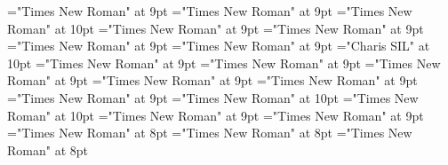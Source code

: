 \documentclass[gps1,twoside]{article}
\begin{document}
\font\complexformtypespansubentrysubentriesentrysubentriesdiventryletData="Times New Roman" at 9pt
\font\spancomplexformtypespansubentrysubentriesentrysubentriesdiventryletData="Times New Roman" at 9pt
\font\spanenspancomplexformtypespansubentrysubentriesentrysubentriesdiventryletData="Times New Roman" at 10pt
\font\spanreverseabbrvariantentrytypevariantentrytypesvariantformentrybackrefvariantformentrybackrefssensesensessensesensessubentrysubentriesentrylastchildafterspancomplexformtypespansubentrysubentriesentrysubentriesdiventryletData="Times New Roman" at 9pt
\font\pronunciationssubentrysubentriesentryaftersubentrysubentriesentrysubentriesdiventryletData="Times New Roman" at 9pt
\font\pronunciationspansubentrysubentriesentrysubentriesdiventryletData="Times New Roman" at 9pt
\font\spanpronunciationspansubentrysubentriesentrysubentriesdiventryletData="Times New Roman" at 9pt
\font\spanbzhfonipaspanpronunciationspansubentrysubentriesentrysubentriesdiventryletData="Charis SIL" at 10pt
\font\spanformpronunciationpronunciationssubentrysubentriesentryfirstchildbeforespanpronunciationspansubentrysubentriesentrysubentriesdiventryletData="Times New Roman" at 9pt
\font\spanformpronunciationpronunciationssubentrysubentriesentrylastchildafterspanpronunciationspansubentrysubentriesentrysubentriesdiventryletData="Times New Roman" at 9pt
\font\sensessubentrysubentriesentryaftersubentrysubentriesentrysubentriesdiventryletData="Times New Roman" at 9pt
\font\spanspansubentrysubentriesentrysubentriesdiventryletData="Times New Roman" at 9pt
\font\sensespanspansubentrysubentriesentrysubentriesdiventryletData="Times New Roman" at 9pt
\font\spansensespanspansubentrysubentriesentrysubentriesdiventryletData="Times New Roman" at 9pt
\font\spanenspansensespanspansubentrysubentriesentrysubentriesdiventryletData="Times New Roman" at 10pt
\font\spandefinitionorglossreferencedentryreferencedentriescomplexformentryrefcomplexformentryrefsminorentryvariantfirstchildbeforespansensespanspansubentrysubentriesentrysubentriesdiventryletData="Times New Roman" at 10pt
\font\spandefinitionorglosssensesensessensesensessubentrysubentriesentrylastchildafterspansensespanspansubentrysubentriesentrysubentriesdiventryletData="Times New Roman" at 9pt
\font\examplessensesensessubentrysubentriesentryaftersensespanspansubentrysubentriesentrysubentriesdiventryletData="Times New Roman" at 9pt
\font\examplespansensespanspansubentrysubentriesentrysubentriesdiventryletData="Times New Roman" at 8pt
\font\examplebeforespansensespanspansubentrysubentriesentrysubentriesdiventryletData="Times New Roman" at 8pt
\font\exampleafterspansensespanspansubentrysubentriesentrysubentriesdiventryletData="Times New Roman" at 8pt
\end{document}
